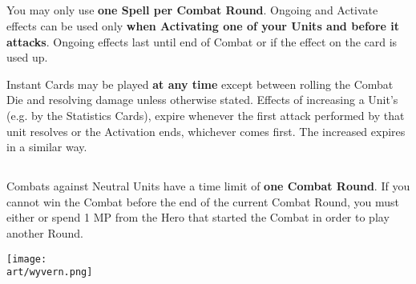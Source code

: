 \begin{multicols}{2}
\subsection*{}
You may only use \textbf{one Spell per Combat Round}.
Ongoing  and  Activate effects can be used only \textbf{when Activating one of your Units and before it attacks}.
Ongoing effects last until end of Combat or if the effect on the card is used up.\par
Instant  Cards may be played \textbf{at any time} except between rolling the Combat Die and resolving damage unless otherwise stated.
Effects of increasing a Unit's  (e.g. by the Statistics Cards), expire whenever the first attack performed by that unit resolves or the Activation ends, whichever comes first.
The increased  expires in a similar way.
\subsection*{}
Combats against Neutral Units have a time limit of \textbf{one Combat Round}.
If you cannot win the Combat before the end of the current Combat Round, you must either  or spend 1 MP from the Hero that started the Combat in order to play another Round.\par

\bigskip


\vfill

\begin{center}
  \texttt{[image: \\art/wyvern.png]}
\end{center}

\filbreak

\subsection*{}


\end{multicols}
